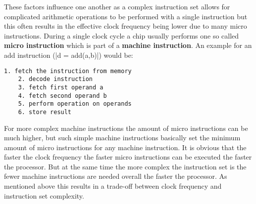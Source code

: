 These factors influence one another as a complex instruction set allows for complicated arithmetic operations to be performed with a single instruction but this often results in the effective clock frequency being lower due to many micro instructions.
During a single clock cycle a chip usually performs one so called \textbf{micro instruction} which is part of a \textbf{machine instruction}.
An example for an add instruction (|d = add(a,b)|) would be:
\begin{lstlisting}[caption=example of micro instructions, label=lst:microinstruction]
    1. fetch the instruction from memory
    2. decode instruction
    3. fetch first operand a
    4. fetch second operand b
    5. perform operation on operands
    6. store result
\end{lstlisting}
For more complex machine instructions the amount of micro instructions can be much higher, but such simple machine instructions basically set the minimum amount of micro instructions for any machine instruction.
It is obvious that the faster the clock frequency the faster micro instructions can be executed the faster the processor.
But at the same time the more complex the instruction set is the fewer machine instructions are needed overall the faster the processor.
As mentioned above this results in a trade-off between clock frequency and instruction set complexity.

